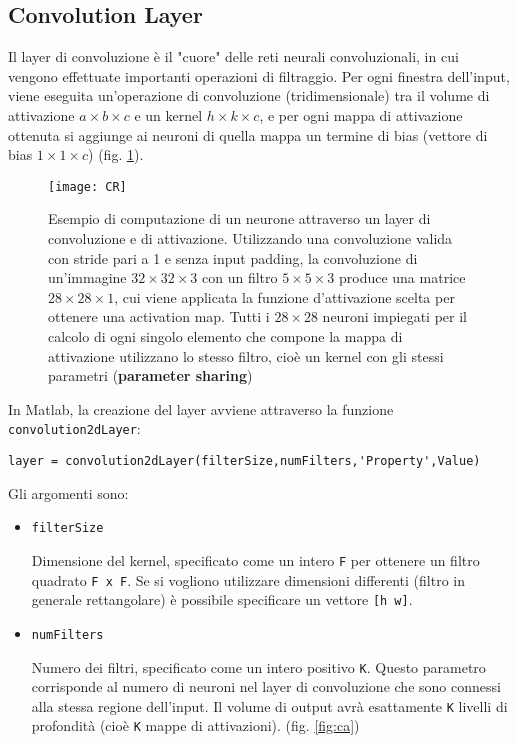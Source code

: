 \subsection{Convolution Layer}
\label{CONV}
Il layer di convoluzione è il "cuore" delle reti neurali convoluzionali, in cui vengono effettuate importanti operazioni di filtraggio. Per ogni finestra dell'input, viene eseguita un'operazione di convoluzione (tridimensionale) tra il volume di attivazione $a\times b\times c$ e un kernel $h\times k\times c$, e per ogni mappa di attivazione ottenuta si aggiunge ai neuroni di quella mappa un termine di bias (vettore di bias $1\times 1\times c$) (fig. \ref{fig:cr}).

\begin{figure}[h]
	\centering
	\texttt{[image: CR]}
	\caption[Convolution layer in una rete neurale convoluzionale]{Esempio di computazione di un neurone attraverso un layer di convoluzione e di attivazione. Utilizzando una convoluzione valida con stride pari a 1 e senza input padding, la convoluzione di un'immagine $32\times32\times3$ con un filtro $5\times5\times3$ produce una matrice $28\times28\times1$, cui viene applicata la funzione d'attivazione scelta per ottenere una activation map. Tutti i $28\times28$ neuroni impiegati per il calcolo di ogni singolo elemento che compone la mappa di attivazione utilizzano lo stesso filtro, cioè un kernel con gli stessi parametri (\textbf{parameter sharing})}
	\label{fig:cr}
\end{figure}

In Matlab, la creazione del layer avviene attraverso la funzione \verb|convolution2dLayer|:

\begin{verbatim}
layer = convolution2dLayer(filterSize,numFilters,'Property',Value)
\end{verbatim}

Gli argomenti sono:

\begin{itemize}
	\item \verb|filterSize|
	
	Dimensione del kernel, specificato come un intero \verb|F| per ottenere un filtro quadrato \verb|F x F|. Se si vogliono utilizzare dimensioni differenti (filtro in generale rettangolare) è possibile specificare un vettore \verb|[h w]|.
	
	\item \verb|numFilters|
	
	Numero dei filtri, specificato come un intero positivo \verb|K|. Questo parametro corrisponde al numero di neuroni nel layer di convoluzione che sono connessi alla stessa regione dell'input. Il volume di output avrà esattamente \verb|K| livelli di profondità (cioè \verb|K| mappe di attivazioni). (fig. \ref{fig:ca})
\end{itemize}

